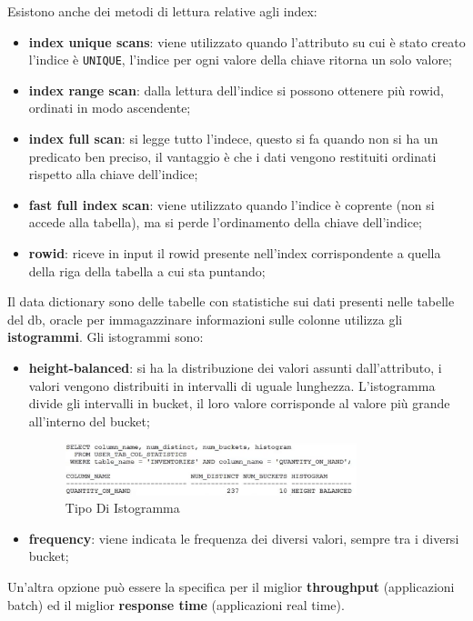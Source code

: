 \documentclass[12pt]{article}
\begin{document}
Esistono anche dei metodi di lettura relative agli index:
\begin{itemize}
    \item \textbf{index unique scans}: viene utilizzato quando l'attributo su cui \`e stato creato l'indice \`e \texttt{UNIQUE}, l'indice per ogni valore della chiave ritorna un solo valore;
    \item \textbf{index range scan}: dalla lettura dell'indice si possono ottenere pi\`u rowid, ordinati in modo ascendente;
    \item \textbf{index full scan}: si legge tutto l'indece, questo si fa quando non si ha un predicato ben preciso, il vantaggio \`e che i dati vengono restituiti ordinati rispetto alla chiave dell'indice;
    \item \textbf{fast full index scan}: viene utilizzato quando l'indice \`e coprente (non si accede alla tabella), ma si perde l'ordinamento della chiave dell'indice;
    \item \textbf{rowid}: riceve in input il rowid presente nell'index corrispondente a quella della riga della tabella a cui sta puntando;
\end{itemize}
Il data dictionary sono delle tabelle con statistiche sui dati presenti nelle tabelle del db, oracle per immagazzinare informazioni sulle colonne utilizza gli \textbf{istogrammi}. Gli istogrammi sono:
\begin{itemize}
    \item \textbf{height-balanced}: si ha la distribuzione dei valori assunti dall'attributo, i valori vengono distribuiti in intervalli di uguale lunghezza. L'istogramma divide gli intervalli in bucket, il loro valore corrisponde al valore pi\`u grande all'interno del bucket;
        \begin{figure}[H]
            \centering
            \includegraphics[width=0.8\textwidth]{tipo-di-istogramma.png}
            \caption{Tipo Di Istogramma}
            \label{fig:tipo-di-istogramma}
        \end{figure}
    \item \textbf{frequency}: viene indicata le frequenza dei diversi valori, sempre tra i diversi bucket;
\end{itemize}
Un'altra opzione pu\`o essere la specifica per il miglior \textbf{throughput} (applicazioni batch) ed il miglior \textbf{response time} (applicazioni real time).
\end{document}
